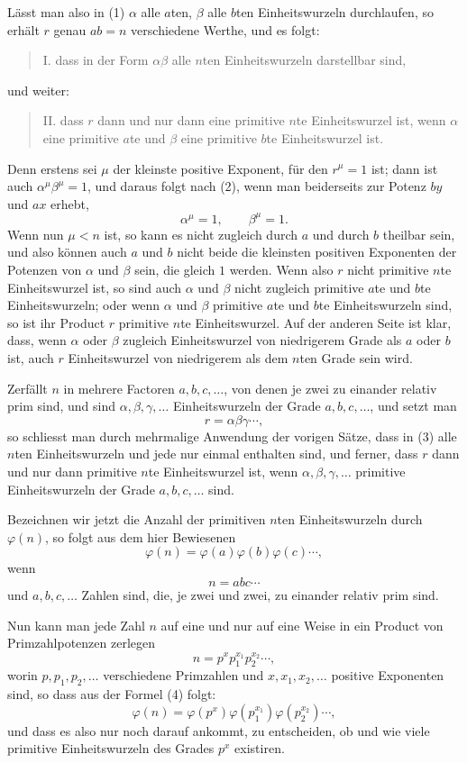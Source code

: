 \documentclass[11pt]{article}
\begin{document}
Lässt man also in (1) $\alpha$ alle $a$ten, $\beta$ alle $b$ten Einheitswurzeln durchlaufen, so erhält $r$ genau $ab=n$ verschiedene Werthe, und es folgt:
\begin{quote}
I. dass in der Form $\alpha\beta$ alle $n$ten Einheitswurzeln darstellbar sind,
\end{quote}
und weiter:
\begin{quote}
II. dass $r$ dann und nur dann eine primitive $n$te Einheitswurzel ist, wenn $\alpha$ eine primitive $a$te und $\beta$ eine primitive $b$te Einheitswurzel ist.
\end{quote}
Denn erstens sei $\mu$ der kleinste positive Exponent, für den $r^\mu=1$ ist; dann ist auch $\alpha^\mu\beta^\mu=1$, und daraus folgt nach (2), wenn man beiderseits zur Potenz $by$ und $ax$ erhebt,
\[
        \alpha^\mu=1,\qquad \beta^\mu=1.
\]
Wenn nun $\mu<n$ ist, so kann es nicht zugleich durch $a$ und durch $b$ theilbar sein, und also können auch $a$ und $b$ nicht beide die kleinsten positiven Exponenten der Potenzen von $\alpha$ und $\beta$ sein, die gleich $1$ werden. Wenn also $r$ nicht primitive $n$te Einheitswurzel ist, so sind auch $\alpha$ und $\beta$ nicht zugleich primitive $a$te und $b$te Einheitswurzeln; oder wenn $\alpha$ und $\beta$ primitive $a$te und $b$te Einheitswurzeln sind, so ist ihr Product $r$ primitive $n$te Einheitswurzel. Auf der anderen Seite ist klar, dass, wenn $\alpha$ oder $\beta$ zugleich Einheitswurzel von niedrigerem Grade als $a$ oder $b$ ist, auch $r$ Einheitswurzel von niedrigerem als dem $n$ten Grade sein wird.

Zerfällt $n$ in mehrere Factoren $a,b,c,\ldots$, von denen je zwei zu einander relativ prim sind, und sind $\alpha,\beta,\gamma,\ldots$ Einheitswurzeln der Grade $a,b,c,\ldots$, und setzt man
\[
\tag{3}        r=\alpha\beta\gamma\cdots,
\]
so schliesst man durch mehrmalige Anwendung der vorigen Sätze, dass in (3) alle $n$ten Einheitswurzeln und jede nur einmal enthalten sind, und ferner, dass $r$ dann und nur dann primitive $n$te Einheitswurzel ist, wenn $\alpha,\beta,\gamma,\ldots$ primitive Einheitswurzeln der Grade $a,b,c,\ldots$ sind.

Bezeichnen wir jetzt die Anzahl der primitiven $n$ten Einheitswurzeln durch $\varphi(n)$, so folgt aus dem hier Bewiesenen
\[
\tag{4}        \varphi(n)=\varphi(a)\varphi(b)\varphi(c)\cdots,
\]
wenn
\[
        n=abc\cdots
\]
und $a,b,c,\ldots$ Zahlen sind, die, je zwei und zwei, zu einander relativ prim sind.

Nun kann man jede Zahl $n$ auf eine und nur auf eine Weise in ein Product von Primzahlpotenzen zerlegen
\[
        n=p^x p_1^{x_1}p_2^{x_2}\cdots,
\]
worin $p,p_1,p_2,\ldots$ verschiedene Primzahlen und $x,x_1,x_2,\ldots$ positive Exponenten sind, so dass aus der Formel (4) folgt:
\[
\tag{5}        \varphi(n)=\varphi(p^x)\varphi(p_1^{x_1})\varphi(p_2^{x_2})\cdots,
\]
und dass es also nur noch darauf ankommt, zu entscheiden, ob und wie viele primitive Einheitswurzeln des Grades $p^x$ existiren.
\end{document}
